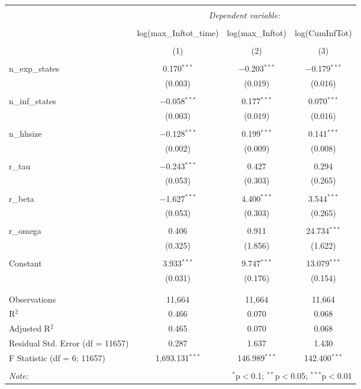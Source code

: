 
\begin{table}[!htbp] \centering 
  \caption{} 
  \label{} 
\begin{tabular}{@{\extracolsep{5pt}}lccc} 
\\[-1.8ex]\hline 
\hline \\[-1.8ex] 
 & \multicolumn{3}{c}{\textit{Dependent variable:}} \\ 
\cline{2-4} 
\\[-1.8ex] & log(max\_Inftot\_time) & log(max\_Inftot) & log(CumInfTot) \\ 
\\[-1.8ex] & (1) & (2) & (3)\\ 
\hline \\[-1.8ex] 
 n\_exp\_states & 0.170$^{***}$ & $-$0.203$^{***}$ & $-$0.179$^{***}$ \\ 
  & (0.003) & (0.019) & (0.016) \\ 
  & & & \\ 
 n\_inf\_states & $-$0.058$^{***}$ & 0.177$^{***}$ & 0.070$^{***}$ \\ 
  & (0.003) & (0.019) & (0.016) \\ 
  & & & \\ 
 n\_hhsize & $-$0.128$^{***}$ & 0.199$^{***}$ & 0.141$^{***}$ \\ 
  & (0.002) & (0.009) & (0.008) \\ 
  & & & \\ 
 r\_tau & $-$0.243$^{***}$ & 0.427 & 0.294 \\ 
  & (0.053) & (0.303) & (0.265) \\ 
  & & & \\ 
 r\_beta & $-$1.627$^{***}$ & 4.400$^{***}$ & 3.544$^{***}$ \\ 
  & (0.053) & (0.303) & (0.265) \\ 
  & & & \\ 
 r\_omega & 0.406 & 0.911 & 24.734$^{***}$ \\ 
  & (0.325) & (1.856) & (1.622) \\ 
  & & & \\ 
 Constant & 3.933$^{***}$ & 9.747$^{***}$ & 13.079$^{***}$ \\ 
  & (0.031) & (0.176) & (0.154) \\ 
  & & & \\ 
\hline \\[-1.8ex] 
Observations & 11,664 & 11,664 & 11,664 \\ 
R$^{2}$ & 0.466 & 0.070 & 0.068 \\ 
Adjusted R$^{2}$ & 0.465 & 0.070 & 0.068 \\ 
Residual Std. Error (df = 11657) & 0.287 & 1.637 & 1.430 \\ 
F Statistic (df = 6; 11657) & 1,693.131$^{***}$ & 146.989$^{***}$ & 142.400$^{***}$ \\ 
\hline 
\hline \\[-1.8ex] 
\textit{Note:}  & \multicolumn{3}{r}{$^{*}$p$<$0.1; $^{**}$p$<$0.05; $^{***}$p$<$0.01} \\ 
\end{tabular} 
\end{table} 
